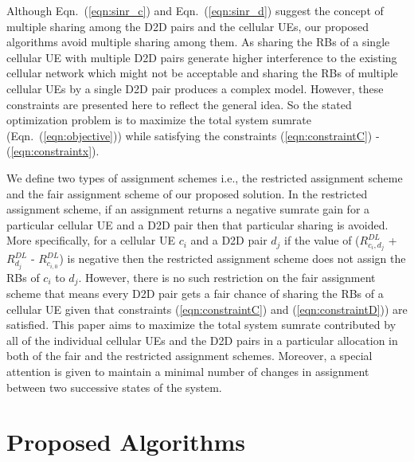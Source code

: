 \documentclass[times]{dacauth}
\begin{document}
\smallskip
\noindent
Although Eqn.~(\ref{eqn:sinr_c}) and Eqn.~(\ref{eqn:sinr_d}) suggest the concept of multiple sharing among the D2D pairs and the cellular UEs, our proposed algorithms avoid multiple sharing among them. As sharing the RBs of a single cellular UE with multiple D2D pairs generate higher interference to the existing cellular network which might not be acceptable and sharing the RBs of multiple cellular UEs by a single D2D pair produces a complex model. However, these constraints are presented here to reflect the general idea. So the stated optimization problem is to maximize the total system sumrate (Eqn.~(\ref{eqn:objective})) while satisfying the constraints (\ref{eqn:constraintC}) - (\ref{eqn:constraintx}).  

\smallskip
\noindent
We define two types of assignment schemes i.e., the restricted assignment scheme and the fair assignment scheme of our proposed solution. In the restricted assignment scheme, if an assignment returns a negative sumrate gain for a particular cellular UE and a D2D pair then that particular sharing is avoided. More specifically, for a cellular UE $c_i$ and a D2D pair $d_j$ if the value of ($R_{c_i,d_j}^{DL}$ + $R_{d_j}^{DL}$ - $R_{c_{i,0}}^{DL}$) is negative then the restricted assignment scheme does not assign the RBs of $c_i$ to $d_j$. However, there is no such restriction on the fair assignment scheme that means every D2D pair gets a fair chance of sharing the RBs of a cellular UE given that constraints (\ref{eqn:constraintC}) and (\ref{eqn:constraintD})) are satisfied. This paper aims to maximize the total system sumrate contributed by all of the individual cellular UEs and the D2D pairs in a particular allocation in both of the fair and the restricted assignment schemes. Moreover, a special attention is given to maintain a minimal number of changes in assignment between two successive states of the system.

\section{Proposed Algorithms}\label{section:Proposed Algorithm}
\end{document}
